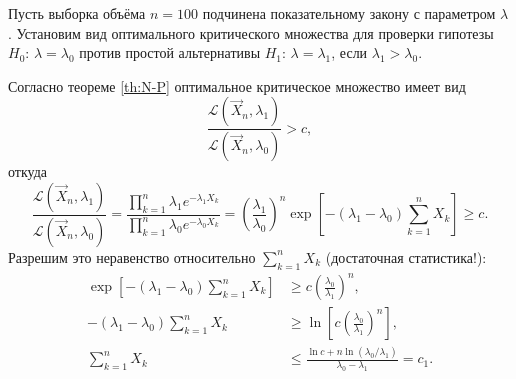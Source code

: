 \begin{ex} 
	Пусть выборка объёма $ n = 100 $ подчинена показательному закону с параметром
	$ \lambda $. Установим вид оптимального критического множества для проверки
	гипотезы $ H_0 $: $ \lambda = \lambda_0 $ против простой альтернативы $ H_1 $:
	$ \lambda = \lambda_1 $, если $ \lambda_1 > \lambda_0 $.
  \begin{solution}
		Согласно теореме \ref{th:N-P} оптимальное критическое множество имеет вид 
		\[
				\frac{\mathscr L(\vec X_n, \lambda_1)}{\mathscr L(\vec X_n, \lambda_0)} > c,
		\]
		откуда  
		\[
				\frac{\mathscr L(\vec X_n, \lambda_1)}{\mathscr L(\vec X_n, \lambda_0)} =
				\frac{\prod^n_{k=1} \lambda_1 e^{-\lambda_1 X_k}}{\prod_{k=1}^n
				\lambda_0 e^{-\lambda_0 X_k}} = \left( \frac{\lambda_1}{\lambda_0}
			\right)^n \exp\left[-\left(\lambda_1 - \lambda_0\right) \sum_{k=1}^n X_k\right] \geqslant c.
		\]
		Разрешим это неравенство относительно $ \sum_{k=1}^n X_k $ (достаточная
		статистика!): 
		\begin{align*}
				\exp\left[-\left(\lambda_1 - \lambda_0\right) \sum_{k=1}^n X_k\right]
				&\geqslant c \left( \frac{\lambda_0}{\lambda_1} \right)^n,\\
        -(\lambda_1 - \lambda_0) \sum_{k=1}^n X_k &\geqslant \ln \left[ c \left(
				\frac{\lambda_0}{\lambda_1}\right)^n  \right],\\
						\sum_{k=1}^n X_k &\leqslant \frac{\ln c + n \ln
				(\lambda_0/\lambda_1)}{\lambda_0 - \lambda_1} = c_1.
		\end{align*}

	\end{solution}	
\end{ex}

